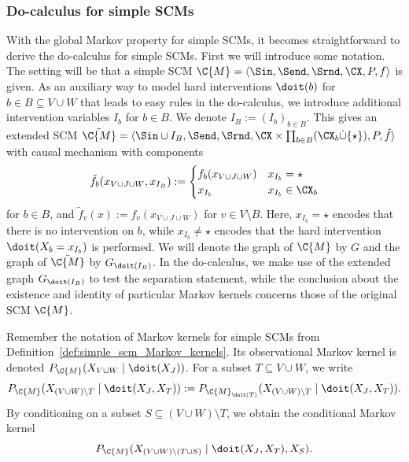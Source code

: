 \subsubsection{Do-calculus for simple SCMs}

With the global Markov property for simple SCMs, it becomes straightforward to derive the do-calculus for simple SCMs.
First we will introduce some notation. The setting will be that a simple SCM $\C{M} = \langle \Sin, \Send, \Srnd, \CX, P, f \rangle$
is given. 
As an auxiliary way to model hard interventions $\doit(b)$ for $b \in B \subseteq V \cup W$ that leads to easy rules in the
do-calculus, we introduce additional intervention variables
$I_b$ for $b \in B$. We denote $I_B := (I_b)_{b \in B}$.
This gives an extended SCM $\tilde{\C{M}} = \langle \Sin \cup I_B, \Send, \Srnd, \CX \times \prod_{b \in B} (\CX_b \dot\cup \{\star\}), P, \tilde{f} \rangle$ with causal mechanism with components
$$\tilde{f}_b(x_{V \cup J \cup W},x_{I_B}) := \begin{cases}
  f_b(x_{V \cup J \cup W}) & x_{I_b} = \star \\
  x_{I_b} & x_{I_b} \in \CX_b
\end{cases}$$
for $b \in B$, and $\tilde{f}_v(x) := f_v(x_{V \cup J \cup W})$ for $v \in V \setminus B$.
Here, $x_{I_b} = \star$ encodes that there is no intervention on $b$, 
while $x_{I_b} \ne \star$ encodes that the hard intervention $\doit(X_b = x_{I_b})$ is performed.
We will denote the graph of $\C{M}$ by $G$ and the graph of $\tilde{\C{M}}$ by $G_{\doit(I_B)}$.
In the do-calculus, we make use of the extended graph $G_{\doit(I_B)}$ to test the separation statement, while the conclusion
about the existence and identity of particular Markov kernels concerns those of the original SCM $\C{M}$.

Remember the notation of Markov kernels for simple SCMs from Definition~\ref{def:simple_scm_Markov_kernels}.
Its observational Markov kernel is denoted $P_{\C{M}}(X_{V\cup W} \mid \doit(X_J))$.
For a subset $T \subseteq V \cup W$, we write 
$$P_{\C{M}}(X_{(V\cup W)\setminus T} \mid \doit(X_J,X_T)) := P_{\C{M}_{\doit(T)}}(X_{(V\cup W)\setminus T} \mid \doit(X_J,X_T)).$$
By conditioning on a subset $S \subseteq (V \cup W) \setminus T$, we obtain the conditional Markov kernel
$$P_{\C{M}}(X_{(V\cup W)\setminus (T \cup S)} \mid \doit(X_J,X_T), X_S).$$

